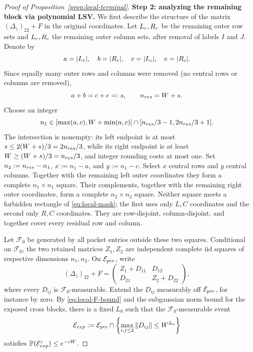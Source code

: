 \documentclass[10pt,a4paper]{amsart}
\renewcommand{\P}{\mathbb P}
\begin{document}
\begin{proof}[Proof of Proposition~\ref{prop:local-terminal}]
\textbf{Step 2: analyzing the remaining block via polynomial LSV.}
We first describe the structure of the matrix $(\Delta_z)_{22}+F$ in the original coordinates.
Let \(L_{\rm r},R_{\rm r}\) be the remaining outer row sets and
\(L_{\rm c},R_{\rm c}\) the remaining outer column sets, after removal of labels $I$ and $J$.  Denote by
\begin{equation}
 a=|L_{\rm r}|,\quad b=|R_{\rm r}|,\quad
 c=|L_{\rm c}|,\quad e=|R_{\rm c}|.
\end{equation}
Since equally many outer rows and columns were removed (no central rows
or columns are removed),
\begin{equation}
 a+b=c+e=:s,\qquad n_{\rm res}=W+s.
 \label{eq:local-counts}
\end{equation}
Choose an integer
\begin{equation}
 n_1\in[\max(a,c),W+\min(a,c)]
       \cap[n_{\rm res}/3-1,2n_{\rm res}/3+1].
 \label{eq:local-n1}
\end{equation}
The intersection is nonempty: its left endpoint is at most
\(s\leq2(W+s)/3=2n_{\rm res}/3\), while its right endpoint is at least
\(W\geq(W+s)/3=n_{\rm res}/3\), and integer rounding costs at most one.
Set \(n_2:=n_{\rm res}-n_1\), \(x:=n_1-a\), and \(y:=n_1-c\).  Select \(x\) central rows and \(y\) central
columns.  Together with the remaining left outer coordinates they form a
complete \(n_1\times n_1\) square.  Their complements, together with the
remaining right outer coordinates, form a complete
\(n_2\times n_2\) square.  Neither square meets a forbidden
rectangle of \eqref{eq:local-mask}; the first uses only \(L,C\) coordinates
and the second only \(R,C\) coordinates.  They are row-disjoint,
column-disjoint, and together cover every residual row and column.

Let \(\mathcal F_0\) be generated by all packet entries outside these two
squares.  Conditional on \(\mathcal F_0\), the two retained matrices
\(Z_1,Z_2\) are independent complete iid squares of respective dimensions
\(n_1,n_2\).  On \(\mathcal E_{\rm piv}\), write
\begin{equation}
 (\Delta_z)_{22}+F=
 \begin{pmatrix}
  Z_1+D_{11}&D_{12}\\D_{21}&Z_2+D_{22}
 \end{pmatrix},
 \label{eq:local-two-cook-blocks}
\end{equation}
where every \(D_{ij}\) is \(\mathcal F_0\)-measurable.  Extend the
\(D_{ij}\) measurably off \(\mathcal E_{\rm piv}\), for instance by zero.
By \eqref{eq:local-F-bound} and the subgaussian norm bound for the exposed
cross blocks, there is a fixed \(L_0\) such that the
\(\mathcal F_0\)-measurable event
\begin{equation}
 \mathcal E_{\rm exp}:=\mathcal E_{\rm piv}\cap
 \left\{\max_{i,j\leq2}\|D_{ij}\|\leq W^{L_0}\right\}
 \label{eq:local-full-exposure-event}
\end{equation}
satisfies \(\P(\mathcal E_{\rm exp}^c)\leq e^{-cW}\).


\end{proof}
\end{document}
